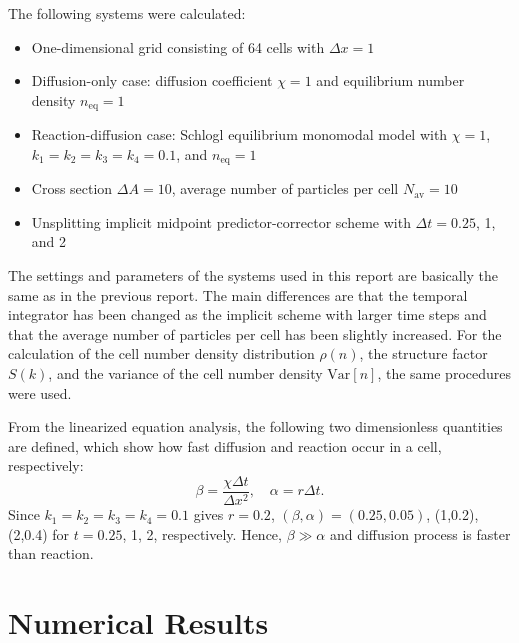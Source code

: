 \documentclass{article}
\begin{document}
The following systems were calculated:
\begin{itemize}
\item One-dimensional grid consisting of 64 cells with $\Delta x=1$
\item Diffusion-only case: diffusion coefficient $\chi=1$ and equilibrium number density $n_\mathrm{eq}=1$
\item Reaction-diffusion case: Schlogl equilibrium monomodal model with $\chi=1$, $k_1=k_2=k_3=k_4=0.1$, and $n_\mathrm{eq}=1$
\item Cross section $\Delta A=10$, average number of particles per cell $N_\mathrm{av}=10$
\item Unsplitting implicit midpoint predictor-corrector scheme with $\Delta t=0.25$, 1, and 2
\end{itemize}
The settings and parameters of the systems used in this report are basically the same as in the previous report.
The main differences are that the temporal integrator has been changed as the implicit scheme with larger time steps and that the average number of particles per cell has been slightly increased.
For the calculation of the cell number density distribution $\rho(n)$, the structure factor $S(k)$, and the variance of the cell number density $\mathrm{Var}[n]$, the same procedures were used.

From the linearized equation analysis, the following two dimensionless quantities are defined, which show how fast diffusion and reaction occur in a cell, respectively:
\begin{equation}
\beta=\frac{\chi\Delta t}{\Delta x^2},\quad \alpha=r\Delta t.
\end{equation}
Since $k_1=k_2=k_3=k_4=0.1$ gives $r=0.2$, $(\beta,\alpha)=(0.25,0.05)$, (1,0.2), (2,0.4) for $t=0.25$, 1, 2, respectively.  
Hence, $\beta\gg\alpha$ and diffusion process is faster than reaction.

\clearpage

\section{Numerical Results}
\end{document}
